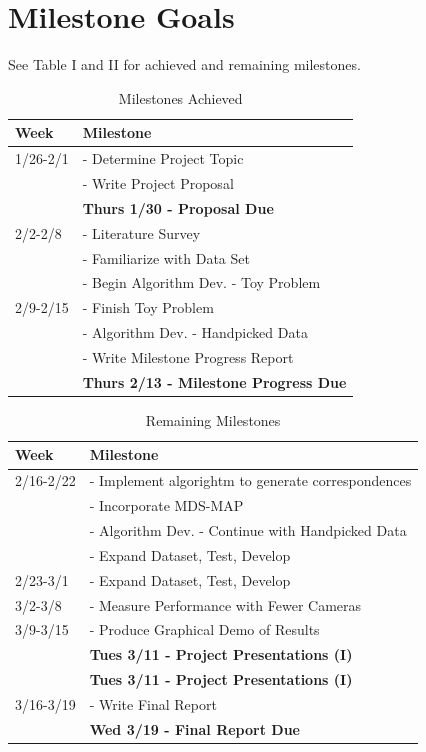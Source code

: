 \documentclass[journal]{IEEEtran}
\begin{document}
\section{Milestone Goals}
	See Table I and II for achieved and remaining milestones.
	\begin{table}[]
		\renewcommand{\arraystretch}{1.3}
		\caption{Milestones Achieved}
		\label{table_example}
		\centering
			\begin{tabular}{l|l}
				\hline
				\bfseries Week & \bfseries Milestone\\
				\hline
				1/26-2/1 & - Determine Project Topic\\
						 & - Write Project Proposal\\
						 & \textbf{Thurs 1/30 - Proposal Due}\\
				\hline
				2/2-2/8 & - Literature Survey\\
					       & - Familiarize with Data Set\\
					       & - Begin Algorithm Dev. - Toy Problem\\
				\hline
				2/9-2/15 & - Finish Toy Problem\\
						 & - Algorithm Dev. - Handpicked Data\\
						 & - Write Milestone Progress Report\\
						 & \textbf{Thurs 2/13 - Milestone Progress Due}\\
				\hline
			\end{tabular}
	\end{table}
	\begin{table}[]
	\renewcommand{\arraystretch}{1.3}
	\caption{Remaining Milestones}
	\label{table_example_2}
	\centering
		\begin{tabular}{l|l}
			\hline
			\bfseries Week & \bfseries Milestone\\
			\hline
			2/16-2/22 & - Implement algorightm to generate correspondences \\
					   & - Incorporate MDS-MAP \\
					   & - Algorithm Dev. - Continue with Handpicked Data\\
					   & - Expand Dataset, Test, Develop\\
			\hline
			2/23-3/1 & - Expand Dataset, Test, Develop\\
			\hline
			3/2-3/8 & - Measure Performance with Fewer Cameras\\
			\hline
			3/9-3/15 & - Produce Graphical Demo of Results\\
					 & \textbf{Tues 3/11 - Project Presentations (I)}\\
					 & \textbf{Tues 3/11 - Project Presentations (I)}\\
			\hline
			3/16-3/19 & - Write Final Report\\
					   & \textbf{Wed 3/19 - Final Report Due}\\
			\hline
		\end{tabular}
	\end{table}
	
\end{document}
